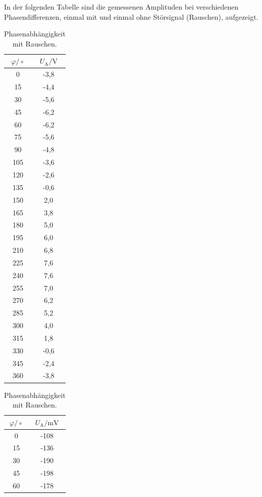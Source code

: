 In der folgenden Tabelle sind die gemessenen Amplituden bei verschiedenen Phasendifferenzen, einmal mit und einmal ohne Störsignal (Rauschen), aufgezeigt.
\begin{table}
\begin{minipage}{0.5\textwidth}
	\centering
	\caption{Phasenunterschied ohne Rauschen.}
	\label{tab:a}
	\begin{tabular}{c|c}
		\toprule
		{$\varphi / \circ $} & {$U_\text{A} / \text{V}$} \\
		\hline
		\midrule
		0 & -3,8 \\
		15 & -4,4 \\
		30 & -5,6 \\
		45 & -6,2 \\
		60 & -6,2 \\
		75 & -5,6 \\
		90 & -4,8 \\
		105 & -3,6 \\
		120 & -2,6 \\
		135 & -0,6 \\
		150 & 2,0 \\
		165 & 3,8 \\
		180 & 5,0 \\
		195 & 6,0 \\
		210 & 6,8 \\
		225 & 7,6 \\
		240 & 7,6 \\
		255 & 7,0 \\
		270 & 6,2 \\
		285 & 5,2 \\
		300 & 4,0 \\
		315 & 1,8 \\
		330 & -0,6 \\
		345 & -2,4 \\
		360 & -3,8 \\
		\bottomrule 
	\end{tabular}
\end{minipage}
\begin{minipage}{0.5\textwidth}
	\centering
	\caption{Phasenabhängigkeit mit Rauschen.}
	\label{tab:b}
	\begin{tabular}{c|c}
		\toprule
		{$\varphi / \circ $} & {$U_\text{A} / \text{mV}$} \\
		\hline
		\midrule
		0 & -108 \\
		15 & -136 \\
		30 & -190\\
		45 & -198\\
		60 & -178\\

\end{tabular}
\end{minipage}
\end{table}
